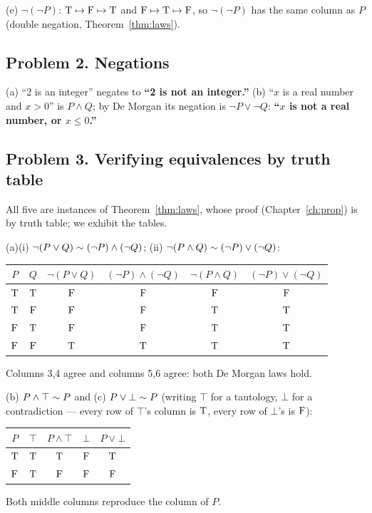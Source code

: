 \noindent(e) $\neg(\neg P)$: $\mathrm{T}\mapsto\mathrm{F}\mapsto\mathrm{T}$ and $\mathrm{F}\mapsto\mathrm{T}\mapsto\mathrm{F}$, so $\neg(\neg P)$ has the same column as $P$ (double negation, Theorem~\ref{thm:laws}).

\subsection*{Problem 2. Negations}
(a) ``2 is an integer'' negates to \textbf{``2 is not an integer.''}
(b) ``$x$ is a real number and $x>0$'' is $P\wedge Q$; by De Morgan its negation is $\neg P\vee\neg Q$: \textbf{``$x$ is not a real number, or $x\le0$.''}

\subsection*{Problem 3. Verifying equivalences by truth table}
All five are instances of Theorem~\ref{thm:laws}, whose proof (Chapter~\ref{ch:prop}) is by truth table; we exhibit the tables.

(a)(i) $\neg(P\vee Q)\sim(\neg P)\wedge(\neg Q)$; (ii) $\neg(P\wedge Q)\sim(\neg P)\vee(\neg Q)$:
\begin{center}
	\begin{tabular}{cc|c|c|c|c}
		\toprule
		$P$&$Q$&$\neg(P\vee Q)$&$(\neg P)\wedge(\neg Q)$&$\neg(P\wedge Q)$&$(\neg P)\vee(\neg Q)$\\
		\midrule
		$\mathrm{T}$&$\mathrm{T}$&$\mathrm{F}$&$\mathrm{F}$&$\mathrm{F}$&$\mathrm{F}$\\
		$\mathrm{T}$&$\mathrm{F}$&$\mathrm{F}$&$\mathrm{F}$&$\mathrm{T}$&$\mathrm{T}$\\
		$\mathrm{F}$&$\mathrm{T}$&$\mathrm{F}$&$\mathrm{F}$&$\mathrm{T}$&$\mathrm{T}$\\
		$\mathrm{F}$&$\mathrm{F}$&$\mathrm{T}$&$\mathrm{T}$&$\mathrm{T}$&$\mathrm{T}$\\
		\bottomrule
	\end{tabular}
\end{center}
Columns 3,4 agree and columns 5,6 agree: both De Morgan laws hold.

(b) $P\wedge\top\sim P$ and (c) $P\vee\bot\sim P$ (writing $\top$ for a tautology, $\bot$ for a contradiction — every row of $\top$'s column is $\mathrm{T}$, every row of $\bot$'s is $\mathrm{F}$):
\begin{center}
	\begin{tabular}{c|c|c|c|c}
		\toprule
		$P$&$\top$&$P\wedge\top$&$\bot$&$P\vee\bot$\\
		\midrule
		$\mathrm{T}$&$\mathrm{T}$&$\mathrm{T}$&$\mathrm{F}$&$\mathrm{T}$\\
		$\mathrm{F}$&$\mathrm{T}$&$\mathrm{F}$&$\mathrm{F}$&$\mathrm{F}$\\
		\bottomrule
	\end{tabular}
\end{center}
Both middle columns reproduce the column of $P$.


